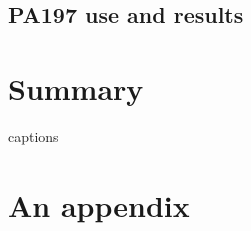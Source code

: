 \documentclass[
  digital, %
  table,   %
  nolof,     %
  nolot,     %
]{fithesis3}
\begin{document}
  \section{PA197 use and results}
\chapter{Summary}




{\csname captions\languagename\endcsname %
\makeatletter %
  \thesis@selectLocale{\thesis@locale}\makeatother
\printbibliography[heading=bibintoc]} %

\appendix %
\chapter{An appendix}
\end{document}
